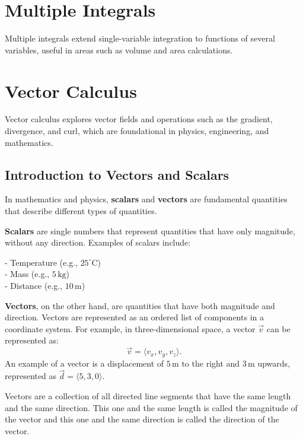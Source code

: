 \documentclass[a4paper,12pt,openany]{book}
\begin{document}

\chapter{Multiple Integrals}
Multiple integrals extend single-variable integration to functions of several variables, useful in areas such as volume and area calculations.


\chapter{Vector Calculus}
Vector calculus explores vector fields and operations such as the gradient, divergence, and curl, which are foundational in physics, engineering, and mathematics.

\section{Introduction to Vectors and Scalars}
In mathematics and physics, \textbf{scalars} and \textbf{vectors} are fundamental quantities that describe different types of quantities.

\textbf{Scalars} are single numbers that represent quantities that have only magnitude, without any direction. Examples of scalars include:

- Temperature (e.g., \(25^\circ \text{C}\))\\
- Mass (e.g., \(5 \, \text{kg}\))\\
- Distance (e.g., \(10 \, \text{m}\))

\textbf{Vectors}, on the other hand, are quantities that have both magnitude and direction. Vectors are represented as an ordered list of components in a coordinate system. For example, in three-dimensional space, a vector \(\vec{v}\) can be represented as:
\[
\vec{v} = \langle v_x, v_y, v_z \rangle.
\]
An example of a vector is a displacement of \(5 \, \text{m}\) to the right and \(3 \, \text{m}\) upwards, represented as \(\vec{d} = \langle 5, 3, 0 \rangle\).


Vectors are a collection of all directed line segments that have the same length and the same direction. This one and the same length is called the magnitude of the vector and this one and the same direction is called the direction of the vector.
\end{document}
